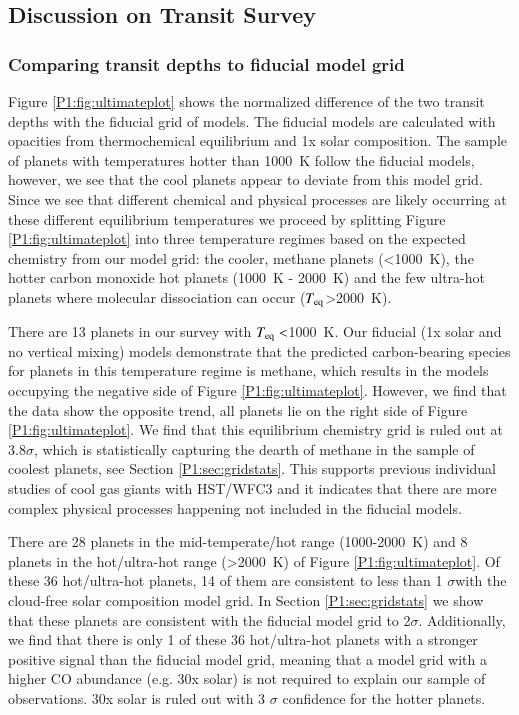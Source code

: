 \subsection{Discussion on Transit Survey}
\subsubsection{Comparing transit depths to fiducial model grid}

Figure \ref{P1:fig:ultimateplot} shows the normalized difference of the two \spitzer transit depths with the fiducial grid of models. The fiducial models are calculated with opacities from thermochemical equilibrium and 1x solar composition. The sample of planets with temperatures hotter than 1000~K follow the fiducial models, however, we see that the cool planets appear to deviate from this model grid. Since we see that different chemical and physical processes are likely occurring at these different equilibrium temperatures we proceed by splitting Figure \ref{P1:fig:ultimateplot} into three temperature regimes based on the expected chemistry from our model grid: the cooler, methane planets (<1000~K), the hotter carbon monoxide hot planets (1000~K - 2000~K) and the few ultra-hot planets where molecular dissociation can occur ($T_{\rm eq}$>2000~K).

There are 13 planets in our survey with $T_{\rm eq}<$1000~K. Our fiducial (1x solar and no vertical mixing) models demonstrate that the predicted carbon-bearing species for planets in this temperature regime is methane, which results in the models occupying the negative side of Figure \ref{P1:fig:ultimateplot}. However, we find that the data show the opposite trend, all planets lie on the right side of Figure \ref{P1:fig:ultimateplot}. We find that this equilibrium chemistry grid is ruled out at 3.8$\sigma$, which is statistically capturing the dearth of methane in the sample of coolest planets, see Section \ref{P1:sec:gridstats}. This supports previous individual studies of cool gas giants with HST/WFC3 and it indicates that there are more complex physical processes happening not included in the fiducial models.

There are 28 planets in the mid-temperate/hot range (1000-2000~K) and 8 planets in the hot/ultra-hot range (>2000~K) of Figure \ref{P1:fig:ultimateplot}. Of these 36 hot/ultra-hot planets, 14 of them are consistent to less than 1 $\sigma$with the cloud-free solar composition model grid. In Section \ref{P1:sec:gridstats} we show that these planets are consistent with the fiducial model grid to 2$\sigma$. Additionally, we find that there is only 1 of these 36 hot/ultra-hot planets with a stronger positive signal than the fiducial model grid, meaning that a model grid with a higher CO abundance (e.g. 30x solar) is not required to explain our sample of observations. 30x solar is ruled out with 3 $\sigma$ confidence for the hotter planets.

